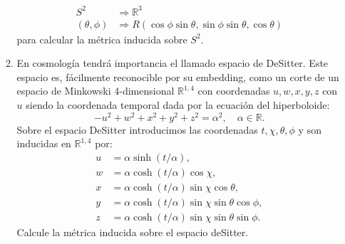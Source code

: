 \documentclass[../main]{subfiles}
\begin{document}
\begin{adjustwidth}{0pt}{-100pt}
\begin{enumerate}
\begin{enumerate}[label=(\alph*)]
        \begin{equation}
            \begin{split}
                S^2 & \Rightarrow \mathbb{R}^3 \\
                (\theta, \phi) & \Rightarrow R(\cos\phi \sin\theta, \sin\phi \sin\theta, \cos\theta)
            \end{split}
        \end{equation}
        para calcular la métrica inducida sobre $S^2$.
        \item En cosmología tendrá importancia el llamado espacio de DeSitter. Este espacio es, fácilmente reconocible por su embedding, como un corte de un espacio de Minkowski 4-dimensional $\mathbb{R}^{1, 4}$ con coordenadas $u, w, x, y, z$ con $u$ siendo la coordenada temporal dada por la ecuación del hiperboloide:
        \begin{equation}
            -u^2+w^2+x^2+y^2+z^2=\alpha^2, \quad \alpha \in \mathbb{R}.
        \end{equation}
        Sobre el espacio DeSitter introducimos las coordenadas $t, \chi, \theta, \phi$ y son inducidas en $\mathbb{R}^{1, 4}$ por:
        \begin{equation}
            \begin{split}
                u&=\alpha \sinh(t/\alpha), \\
                w&=\alpha \cosh(t/\alpha)\cos \chi,\\
                x&=\alpha \cosh(t/\alpha)\sin \chi \cos \theta,\\
                y&=\alpha \cosh(t/\alpha)\sin \chi \sin \theta \cos \phi,\\
                z&=\alpha \cosh(t/\alpha)\sin \chi \sin \theta \sin \phi.
            \end{split}
        \end{equation}
        Calcule la métrica inducida sobre el espacio deSitter.
    \end{enumerate}
\end{enumerate}
\end{adjustwidth}
\end{document}
